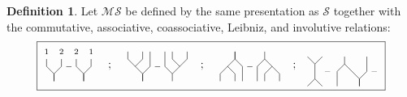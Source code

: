 \documentclass{amsart}
\renewcommand{\S}{\mathcal{S}}
\newcommand{\MS}{\mathcal{MS}}
\theoremstyle{definition}
\newtheorem{definition}[theorem]{Definition}
\begin{document}
	\begin{definition}\label{Prop MS}
		Let $\MS$ be defined by the same presentation as $\S$ together with the commutative, associative, coassociative, Leibniz, and involutive relations:
		\begin{equation*}	
			\boxed{
				\begin{tikzpicture}[scale=.23]
				\node at (4.8,4.2){};
				\node at (4.8,-.2){};
				
				\node at (5,4){$\scriptstyle 1$};
				\node at (7,4){$\scriptstyle 2$};
				\draw (5,3)--(5,2)--(6,1)--(6,0);
				\draw (7,3)--(7,2)--(6,1)--(6,0);
				
				\node at (8,2){$\scriptstyle -$};
				
				\node at (9,4){$\scriptstyle 2$};
				\node at (11,4){$\scriptstyle 1$};
				\draw (9,3)--(9,2)--(10,1)--(10,0);
				\draw (11,3)--(11,2)--(10,1)--(10,0);
				
				\node at (13.5,2){;};
				\end{tikzpicture}\ \ 
				\begin{tikzpicture}[scale=.23]
				\node at (4.8,4.2){};
				\node at (4.8,-.2){};
				
				\draw (7,4)--(7,3)--(6,2);
				\draw (5,4)--(5,3)--(7,1)--(7,0);
				\draw (8,4)--(8,2)--(7,1)--(7,0);
				\node at (9,2){$\scriptstyle -$};
				
				\draw (10,4)--(10,2)--(11,1)--(11,0);
				\draw (13,4)--(13,3)--(11,1);
				\draw (11,4)--(11,3)--(12,2);
				
				\node at (15,2){;};
				\end{tikzpicture}\ \ 
				\begin{tikzpicture}[scale=.23]
				\node at (4.8,-4.2){};
				\node at (4.8,.2){};
				
				\draw (7,-4)--(7,-3)--(6,-2);
				\draw (5,-4)--(5,-3)--(7,-1)--(7,0);
				\draw (8,-4)--(8,-2)--(7,-1)--(7,0);
				\node at (9,-2){$\scriptstyle -$};
				
				\draw (10,-4)--(10,-2)--(11,-1)--(11,0);
				\draw (13,-4)--(13,-3)--(11,-1);
				\draw (11,-4)--(11,-3)--(12,-2);
				
				\node at (15,-2){;};
				\end{tikzpicture}\ \ 
				\begin{tikzpicture}[scale=.23]
				\draw (0,4)--(1,3)--(1,1)--(0,0);
				\draw (2,4)--(1,3);
				\draw (1,1)--(2,0);
				\node at (2.7,2){$\scriptstyle -$};
				
				\draw (5,4)--(5,3)--(4,2)--(4,0);
				\draw (5,3)--(7,1)--(7,0);
				\draw (8,4)--(8,2)--(7,1)--(7,0);
				\node at (9,2){$\scriptstyle -$};
				

\end{tikzpicture}}
\end{equation*}
\end{definition}
\end{document}
